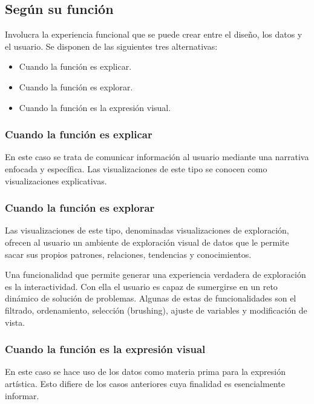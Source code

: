 \subsection{Según su función}

Involucra la experiencia funcional que se puede crear entre el diseño, los datos y el usuario. Se disponen de las siguientes tres alternativas:

\begin{itemize}
  \item Cuando la función es explicar.
  \item Cuando la función es explorar.
  \item Cuando la función es la expresión visual.
\end{itemize}

\subsubsection{Cuando la función es explicar}

En este caso se trata de comunicar información al usuario mediante una narrativa enfocada y específica. Las visualizaciones de este tipo se conocen como visualizaciones explicativas.

\subsubsection{Cuando la función es explorar}

Las visualizaciones de este tipo, denominadas visualizaciones de exploración, ofrecen al usuario un ambiente de exploración visual de datos que le permite sacar sus propios patrones, relaciones, tendencias y conocimientos.

Una funcionalidad que permite generar una experiencia verdadera de exploración es la interactividad. Con ella el usuario es capaz de sumergirse en un reto dinámico de solución de problemas. Algunas de estas de funcionalidades son el filtrado, ordenamiento, selección (brushing), ajuste de variables y modificación de vista.

\subsubsection{Cuando la función es la expresión visual}

En este caso se hace uso de los datos como materia prima para la expresión artística. Esto difiere de los casos anteriores cuya finalidad es esencialmente informar.

